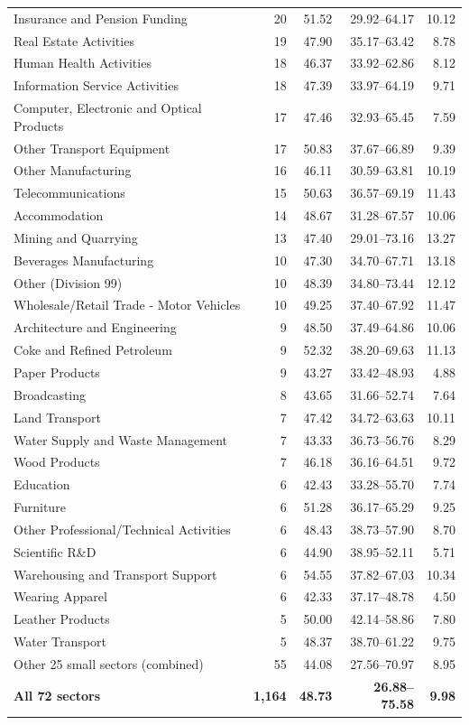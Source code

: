\begin{table}[p]
\begin{singlepagetable}
\begin{tabularx}{\linewidth}{@{}Yrrrr@{}}
Insurance and Pension Funding & 20 & 51.52 & 29.92--64.17 & 10.12 \\
Real Estate Activities & 19 & 47.90 & 35.17--63.42 & 8.78 \\
Human Health Activities & 18 & 46.37 & 33.92--62.86 & 8.12 \\
Information Service Activities & 18 & 47.39 & 33.97--64.19 & 9.71 \\
Computer, Electronic and Optical Products & 17 & 47.46 & 32.93--65.45 & 7.59 \\
Other Transport Equipment & 17 & 50.83 & 37.67--66.89 & 9.39 \\
Other Manufacturing & 16 & 46.11 & 30.59--63.81 & 10.19 \\
Telecommunications & 15 & 50.63 & 36.57--69.19 & 11.43 \\
Accommodation & 14 & 48.67 & 31.28--67.57 & 10.06 \\
Mining and Quarrying & 13 & 47.40 & 29.01--73.16 & 13.27 \\
Beverages Manufacturing & 10 & 47.30 & 34.70--67.71 & 13.18 \\
Other (Division 99) & 10 & 48.39 & 34.80--73.44 & 12.12 \\
Wholesale/Retail Trade - Motor Vehicles & 10 & 49.25 & 37.40--67.92 & 11.47 \\
Architecture and Engineering & 9 & 48.50 & 37.49--64.86 & 10.06 \\
Coke and Refined Petroleum & 9 & 52.32 & 38.20--69.63 & 11.13 \\
Paper Products & 9 & 43.27 & 33.42--48.93 & 4.88 \\
Broadcasting & 8 & 43.65 & 31.66--52.74 & 7.64 \\
Land Transport & 7 & 47.42 & 34.72--63.63 & 10.11 \\
Water Supply and Waste Management & 7 & 43.33 & 36.73--56.76 & 8.29 \\
Wood Products & 7 & 46.18 & 36.16--64.51 & 9.72 \\
Education & 6 & 42.43 & 33.28--55.70 & 7.74 \\
Furniture & 6 & 51.28 & 36.17--65.29 & 9.25 \\
Other Professional/Technical Activities & 6 & 48.43 & 38.73--57.90 & 8.70 \\
Scientific R\&D & 6 & 44.90 & 38.95--52.11 & 5.71 \\
Warehousing and Transport Support & 6 & 54.55 & 37.82--67.03 & 10.34 \\
Wearing Apparel & 6 & 42.33 & 37.17--48.78 & 4.50 \\
Leather Products & 5 & 50.00 & 42.14--58.86 & 7.80 \\
Water Transport & 5 & 48.37 & 38.70--61.22 & 9.75 \\
\midrule
Other 25 small sectors (combined) & 55 & 44.08 & 27.56--70.97 & 8.95\\
\textbf{All 72 sectors} & \textbf{1,164} & \textbf{48.73} & \textbf{26.88--75.58} & \textbf{9.98}\\\bottomrule
\end{tabularx}
\endgroup
\end{singlepagetable}
\end{table}
